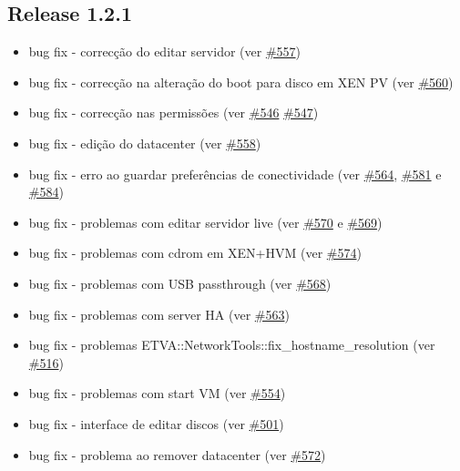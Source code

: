 \subsection{Release 1.2.1}

\begin{itemize}
	\item bug fix - correcção do editar servidor (ver \href{https://srcmaster.eurotux.com/pm/p/etva/ticket/557}{\#557})
	\item bug fix - correcção na alteração do boot para disco em XEN PV (ver \href{https://srcmaster.eurotux.com/pm/p/etva/ticket/560}{\#560})
	\item bug fix - correcção nas permissões (ver \href{https://srcmaster.eurotux.com/pm/p/etva/ticket/546}{\#546} \href{https://srcmaster.eurotux.com/pm/p/etva/ticket/547}{\#547})
	\item bug fix - edição do datacenter (ver \href{https://srcmaster.eurotux.com/pm/p/etva/ticket/558}{\#558})
	\item bug fix - erro ao guardar preferências de conectividade (ver \href{https://srcmaster.eurotux.com/pm/p/etva/ticket/564}{\#564}, \href{https://srcmaster.eurotux.com/pm/p/etva/ticket/581}{\#581} e \href{https://srcmaster.eurotux.com/pm/p/etva/ticket/584}{\#584})
	\item bug fix - problemas com editar servidor live (ver \href{https://srcmaster.eurotux.com/pm/p/etva/ticket/570}{\#570} e \href{https://srcmaster.eurotux.com/pm/p/etva/ticket/569}{\#569})
	\item bug fix - problemas com cdrom em XEN+HVM (ver \href{https://srcmaster.eurotux.com/pm/p/etva/ticket/574}{\#574})
	\item bug fix - problemas com USB passthrough (ver \href{https://srcmaster.eurotux.com/pm/p/etva/ticket/568}{\#568})
	\item bug fix - problemas com server HA (ver \href{https://srcmaster.eurotux.com/pm/p/etva/ticket/563}{\#563})
	\item bug fix - problemas ETVA::NetworkTools::fix\_hostname\_resolution (ver \href{https://srcmaster.eurotux.com/pm/p/etva/ticket/516}{\#516})
	\item bug fix - problemas com start VM (ver \href{https://srcmaster.eurotux.com/pm/p/etva/ticket/554}{\#554})
	\item bug fix - interface de editar discos (ver \href{https://srcmaster.eurotux.com/pm/p/etva/ticket/501}{\#501})
	\item bug fix - problema ao remover datacenter (ver \href{https://srcmaster.eurotux.com/pm/p/etva/ticket/572}{\#572})

\end{itemize}

